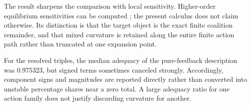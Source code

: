 The result sharpens the comparison with local sensitivity. Higher-order
equilibrium sensitivities can be computed
\cite{nam2000eigensensitivity,zamoracardenas2013multiparameter}; the present
calculus does not claim otherwise. Its distinction is that the target object
is the exact finite coalition remainder, and that mixed curvature is retained
along the entire finite action path rather than truncated at one expansion
point.

For the resolved triples, the median adequacy of the pure-feedback
description was 0.975323, but signed terms sometimes canceled strongly.
Accordingly, component signs and magnitudes are reported directly rather than
converted into unstable percentage shares near a zero total. A large
adequacy ratio for one action family does not justify discarding curvature
for another.
